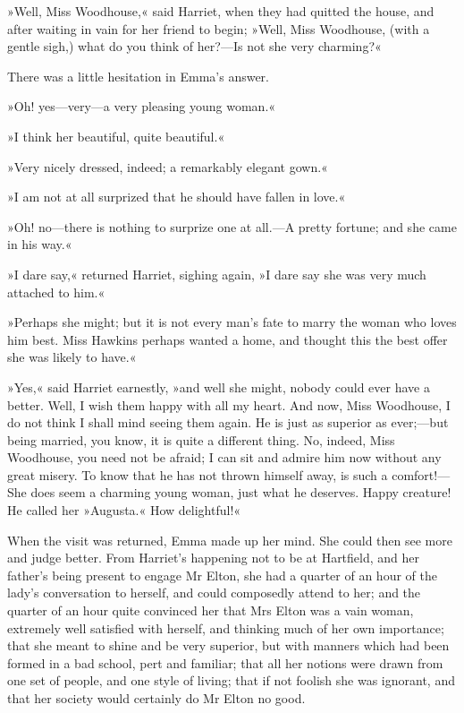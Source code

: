»Well, Miss Woodhouse,« said Harriet, when they had quitted the house, and after waiting in vain for her friend to begin; »Well, Miss Woodhouse, (with a gentle sigh,) what do you think of her?—Is not she very charming?«

There was a little hesitation in Emma's answer.

»Oh! yes—very—a very pleasing young woman.«

»I think her beautiful, quite beautiful.«

»Very nicely dressed, indeed; a remarkably elegant gown.«

»I am not at all surprized that he should have fallen in love.«

»Oh! no—there is nothing to surprize one at all.—A pretty fortune; and she came in his way.«

»I dare say,« returned Harriet, sighing again, »I dare say she was very much attached to him.«

»Perhaps she might; but it is not every man's fate to marry the woman who loves him best. Miss Hawkins perhaps wanted a home, and thought this the best offer she was likely to have.«

»Yes,« said Harriet earnestly, »and well she might, nobody could ever have a better. Well, I wish them happy with all my heart. And now, Miss Woodhouse, I do not think I shall mind seeing them again. He is just as superior as ever;—but being married, you know, it is quite a different thing. No, indeed, Miss Woodhouse, you need not be afraid; I can sit and admire him now without any great misery. To know that he has not thrown himself away, is such a comfort!—She does seem a charming young woman, just what he deserves. Happy creature! He called her »Augusta.« How delightful!«

When the visit was returned, Emma made up her mind. She could then see more and judge better. From Harriet's happening not to be at Hartfield, and her father's being present to engage Mr Elton, she had a quarter of an hour of the lady's conversation to herself, and could composedly attend to her; and the quarter of an hour quite convinced her that Mrs Elton was a vain woman, extremely well satisfied with herself, and thinking much of her own importance; that she meant to shine and be very superior, but with manners which had been formed in a bad school, pert and familiar; that all her notions were drawn from one set of people, and one style of living; that if not foolish she was ignorant, and that her society would certainly do Mr Elton no good.

